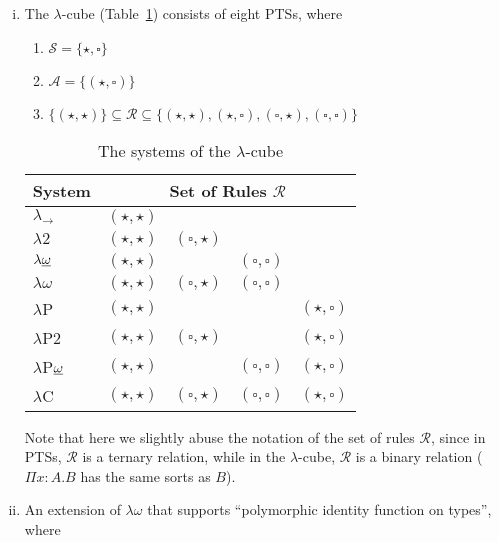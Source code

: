 \documentclass[oneside,a4paper]{article}
\numberwithin{equation}{section}
\begin{document}
\begin{enumerate}[(i)]

\item The $\lambda$-cube (Table~\ref{tab:lambda}) consists of eight PTSs, where

\begin{enumerate}
\item $\mathcal{S} = \{\star,\square\}$
\item $\mathcal{A} = \{(\star, \square)\}$
\item $\{(\star, \star)\} \subseteq \mathcal{R} \subseteq \{(\star, \star), (\star, \square), (\square, \star), (\square, \square)\}$
\end{enumerate}


\begin{table}[h!]
\centering
\begin{tabular}{|l|llll|}
\hline
System & \multicolumn{4}{|c|}{Set of Rules $\mathcal{R}$} \\ \hline
$\lambda_{\rightarrow}$ & $(\star, \star)$ & & & \\
$\lambda2$ & $(\star, \star)$ & $(\square, \star)$ & & \\ 
$\lambda\underbar{$\omega$}$ & $(\star, \star)$ & &  $(\square, \square)$ & \\ 
$\lambda\omega$ & $(\star, \star)$ & $(\square, \star)$ & $(\square, \square)$ & \\ 
$\lambda$P & $(\star, \star)$ & & & $(\star, \square)$ \\ 
$\lambda$P2 & $(\star, \star)$ & $(\square, \star)$ & & $(\star, \square)$ \\ 
$\lambda$P$\underbar{$\omega$}$ & $(\star, \star)$ & & $(\square, \square)$ & $(\star, \square)$ \\ 
$\lambda$C & $(\star, \star)$ & $(\square, \star)$ & $(\square, \square)$ & $(\star, \square)$ \\ \hline
\end{tabular}
\caption{The systems of the $\lambda$-cube}
\label{tab:lambda}
\end{table}

Note that here we slightly abuse the notation of the set of rules $\mathcal{R}$, since in PTSs, $\mathcal{R}$ is a ternary relation, while in the $\lambda$-cube, $\mathcal{R}$ is a binary relation ($\Pi x: A.B$ has the same sorts as $B$).


\item An extension of $\lambda\omega$ that supports ``polymorphic identity function on types'', where


\end{enumerate}
\end{document}
